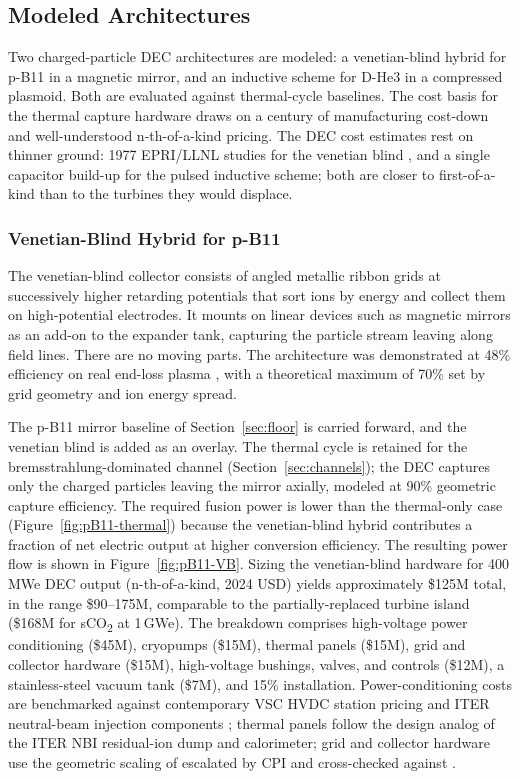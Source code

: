 \documentclass{article}
\begin{document}
\subsection{Modeled Architectures}
\label{sec:modeled}

Two charged-particle DEC architectures are modeled: a venetian-blind
hybrid for p-B11 in a magnetic mirror, and an inductive scheme for
D-He3 in a compressed plasmoid. Both are evaluated against
thermal-cycle baselines. The cost basis for the thermal capture
hardware draws on a century of manufacturing cost-down and
well-understood n-th-of-a-kind pricing. The DEC cost estimates rest
on thinner ground: 1977 EPRI/LLNL studies for the venetian blind
\citep{Hoffman1977}, and a single capacitor build-up for the pulsed
inductive scheme; both are closer to first-of-a-kind than to the
turbines they would displace.

\subsubsection{Venetian-Blind Hybrid for p-B11}
\label{sec:vb}

The venetian-blind collector \citep{MoirBarr1973} consists of
angled metallic ribbon grids at successively higher retarding
potentials that sort ions by energy and collect them on
high-potential electrodes. It mounts on linear devices such as
magnetic mirrors as an add-on to the expander tank, capturing the
particle stream leaving along field lines. There are no moving
parts. The architecture was demonstrated at 48\% efficiency on real
end-loss plasma \citep{BarrMoir1983}, with a theoretical maximum of
70\% set by grid geometry and ion energy spread.

The p-B11 mirror baseline of Section~\ref{sec:floor} is carried
forward, and the venetian blind is added as an overlay. The thermal
cycle is retained for the bremsstrahlung-dominated channel
(Section~\ref{sec:channels}); the DEC captures only the charged
particles leaving the mirror axially, modeled at 90\% geometric
capture efficiency. The required fusion power is lower than the
thermal-only case (Figure~\ref{fig:pB11-thermal}) because the
venetian-blind hybrid contributes a fraction of net electric output
at higher conversion efficiency. The resulting power flow is shown
in Figure~\ref{fig:pB11-VB}. Sizing the venetian-blind hardware for
400\,MWe DEC output (n-th-of-a-kind, 2024 USD) yields approximately
\$125M total, in the range \$90--175M, comparable to the
partially-replaced turbine island (\$168M for sCO\textsubscript{2}
at 1\,GWe). The breakdown comprises high-voltage power
conditioning (\$45M), cryopumps (\$15M), thermal panels (\$15M),
grid and collector hardware (\$15M), high-voltage bushings, valves,
and controls (\$12M), a stainless-steel vacuum tank (\$7M), and
15\% installation. Power-conditioning costs are benchmarked against
contemporary VSC HVDC station pricing and ITER neutral-beam
injection components \citep{Hemsworth2017}; thermal panels follow
the design analog of the ITER NBI residual-ion dump and calorimeter;
grid and collector hardware use the geometric scaling of
\citet{Hoffman1977} escalated by CPI and cross-checked against
\citet{BarrMoir1983}.
\end{document}
